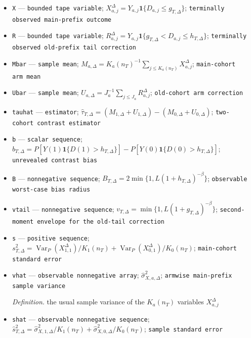 \documentclass{article}
\begin{document}
\begin{itemize}
  \item \texttt{X} --- \texttt{bounded tape variable}; \(X_{a,j}^{\Delta}=Y_{a,j}\mathbf 1\{D_{a,j}\leq g_{T,\Delta}\}\); \texttt{terminally observed main-\allowbreak{}prefix outcome}
  \item \texttt{R} --- \texttt{bounded tape variable}; \(R_{a,j}^{\Delta}=Y_{a,j}\mathbf 1\{g_{T,\Delta}<D_{a,j}\leq h_{T,\Delta}\}\); \texttt{terminally observed old-\allowbreak{}prefix tail correction}
  \item \texttt{Mbar} --- \texttt{sample mean}; \(M_{a,\Delta}=K_a(n_T)^{-1}\sum_{j\leq K_a(n_T)}X_{a,j}^{\Delta}\); \texttt{main-\allowbreak{}cohort arm mean}
  \item \texttt{Ubar} --- \texttt{sample mean}; \(U_{a,\Delta}=J_a^{-1}\sum_{j\leq J_a}R_{a,j}^{\Delta}\); \texttt{old-\allowbreak{}cohort arm correction}
  \item \texttt{tauhat} --- \texttt{estimator}; \(\widehat\tau_{T,\Delta}=(M_{1,\Delta}+U_{1,\Delta})-(M_{0,\Delta}+U_{0,\Delta})\); \texttt{two-\allowbreak{}cohort contrast estimator}
  \item \texttt{b} --- \texttt{scalar sequence}; \(b_{T,\Delta}=P[Y(1)\mathbf 1\{D(1)>h_{T,\Delta}\}]-P[Y(0)\mathbf 1\{D(0)>h_{T,\Delta}\}]\); \texttt{unrevealed contrast bias}
  \item \texttt{B} --- \texttt{nonnegative sequence}; \(B_{T,\Delta}=2\min\{1,L(1+h_{T,\Delta})^{-\beta}\}\); \texttt{observable worst-\allowbreak{}case bias radius}
  \item \texttt{vtail} --- \texttt{nonnegative sequence}; \(v_{T,\Delta}=\min\{1,L(1+g_{T,\Delta})^{-\beta}\}\); \texttt{second-\allowbreak{}moment envelope for the old-\allowbreak{}tail correction}
  \item \texttt{s} --- \texttt{positive sequence}; \(s_{T,\Delta}^2=\operatorname{Var}_P(X_{1,1}^{\Delta})/K_1(n_T)+\operatorname{Var}_P(X_{0,1}^{\Delta})/K_0(n_T)\); \texttt{main-\allowbreak{}cohort standard error}
  \item \texttt{vhat} --- \texttt{observable nonnegative array}; \(\widehat\sigma_{X,a,\Delta}^2\); \texttt{armwise main-\allowbreak{}prefix sample variance}
  \par\smallskip\noindent\emph{Definition.} the usual sample variance of the \(K_a(n_T)\) variables \(X_{a,j}^{\Delta}\)
  \item \texttt{shat} --- \texttt{observable nonnegative sequence}; \(\widehat s_{T,\Delta}^2=\widehat\sigma_{X,1,\Delta}^2/K_1(n_T)+\widehat\sigma_{X,0,\Delta}^2/K_0(n_T)\); \texttt{sample standard error}

\end{itemize}
\end{document}
